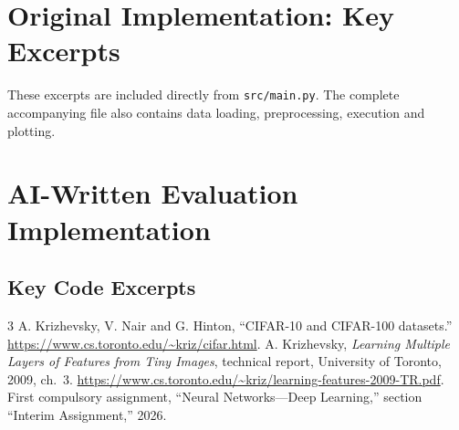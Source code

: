 \documentclass[letterpaper,journal]{IEEEtran}
\newcommand{\code}[1]{\texttt{#1}}
\begin{document}
\section{Original Implementation: Key Excerpts}
These excerpts are included directly from \code{src/main.py}. The complete
accompanying file also contains data loading, preprocessing, execution and plotting.
\par\noindent\begin{minipage}{\linewidth}

\end{minipage}\par
\par\noindent\begin{minipage}{\linewidth}

\end{minipage}\par
\par\noindent\begin{minipage}{\linewidth}

\end{minipage}\par
\par\noindent\begin{minipage}{\linewidth}

\end{minipage}\par

\clearpage
\section{AI-Written Evaluation Implementation}
\label{app:ai}

\subsection{Key Code Excerpts}


\begin{thebibliography}{3}
A. Krizhevsky, V. Nair and G. Hinton, ``CIFAR-10 and CIFAR-100 datasets.''
\url{https://www.cs.toronto.edu/~kriz/cifar.html}.
A. Krizhevsky, \emph{Learning Multiple Layers of Features from Tiny Images},
technical report, University of Toronto, 2009, ch.~3.
\url{https://www.cs.toronto.edu/~kriz/learning-features-2009-TR.pdf}.
First compulsory assignment, ``Neural Networks---Deep Learning,''
section ``Interim Assignment,'' 2026.
\end{thebibliography}
\end{document}
